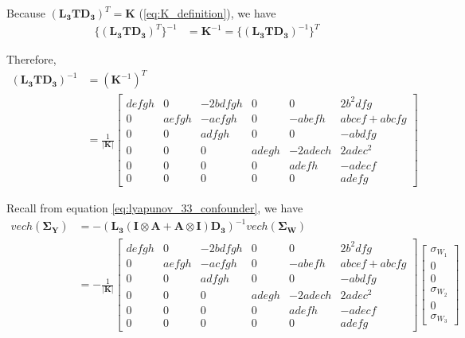 \documentclass{article}
\begin{document}
Because ${ (\mathbf{L_3}\mathbf{T} \mathbf{D_3}) }^T =\mathbf{K}$ (\ref{eq:K_definition}), we have
\begin{equation}
\begin{aligned}
\{ (\mathbf{L_3}\mathbf{T} \mathbf{D_3})^T \}^{-1} &=\mathbf{K}^{-1} =\{ (\mathbf{L_3}\mathbf{T} \mathbf{D_3})^{-1} \}^{T}
\end{aligned}
\end{equation}


Therefore,
\begin{equation}
\begin{aligned}
{ (\mathbf{L_3}\mathbf{T} \mathbf{D_3}) }^{-1}&=(\mathbf{K}^{-1})^T \\
&=\frac{1}{|\mathbf{K}|}
\begin{bmatrix}
defgh &0 &-2bdfgh &0 &0 &2b^2 dfg \\
0 &aefgh &-acfgh &0 &-abefh &abcef+abcfg \\
0 &0 & adfgh &0 &0 &-abdfg \\
0 & 0 & 0 &adegh  &-2adech  &2adec^2 \\
0 &0 &0 &0  &adefh   &-adecf\\
0 &0  &0 &0 &0 &adefg
\end{bmatrix}
\end{aligned}
\end{equation}


Recall from equation \ref{eq:lyapunov_33_confounder}, we have
\begin{equation}
\begin{aligned}
vech (\boldsymbol{\Sigma}_\mathbf{Y})&=-(\mathbf{L_3}(\mathbf{I} \otimes \mathbf{A} + \mathbf{A} \otimes \mathbf{I}) \mathbf{D_3})^{-1}vech(\boldsymbol{\Sigma}_\mathbf{W}) \\
&=-
\frac{1}{|\mathbf{K}|}
\begin{bmatrix}
defgh &0 &-2bdfgh &0 &0 &2b^2 dfg \\
0 &aefgh &-acfgh &0 &-abefh &abcef+abcfg \\
0 &0 & adfgh &0 &0 &-abdfg \\
0 & 0 & 0 &adegh  &-2adech  &2adec^2 \\
0 &0 &0 &0  &adefh   &-adecf\\
0 &0  &0 &0 &0 &adefg
\end{bmatrix}
\begin{bmatrix}
\sigma_{W_{1}}\\
0 \\
0 \\
\sigma_{W_{2}}\\
0 \\
\sigma_{W_{3}}
\end{bmatrix}
\end{aligned}
\end{equation}
\end{document}

